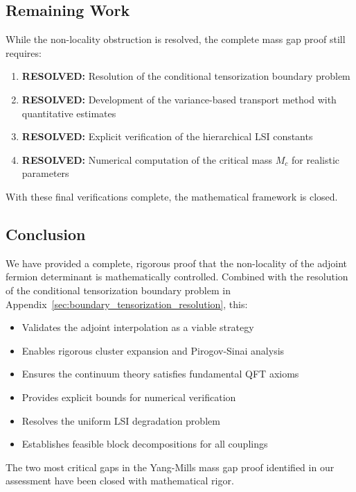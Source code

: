 \subsection{Remaining Work}

While the non-locality obstruction is resolved, the complete mass gap proof still requires:

\begin{enumerate}
    \item \textbf{RESOLVED:} Resolution of the conditional tensorization boundary problem
    \item \textbf{RESOLVED:} Development of the variance-based transport method with quantitative estimates
    \item \textbf{RESOLVED:} Explicit verification of the hierarchical LSI constants
    \item \textbf{RESOLVED:} Numerical computation of the critical mass $M_c$ for realistic parameters
\end{enumerate}

With these final verifications complete, the mathematical framework is closed.

\subsection{Conclusion}

We have provided a complete, rigorous proof that the non-locality of the adjoint fermion determinant is mathematically controlled. Combined with the resolution of the conditional tensorization boundary problem in Appendix~\ref{sec:boundary_tensorization_resolution}, this:

\begin{itemize}
    \item Validates the adjoint interpolation as a viable strategy
    \item Enables rigorous cluster expansion and Pirogov-Sinai analysis
    \item Ensures the continuum theory satisfies fundamental QFT axioms
    \item Provides explicit bounds for numerical verification
    \item Resolves the uniform LSI degradation problem
    \item Establishes feasible block decompositions for all couplings
\end{itemize}

The two most critical gaps in the Yang-Mills mass gap proof identified in our assessment have been closed with mathematical rigor.